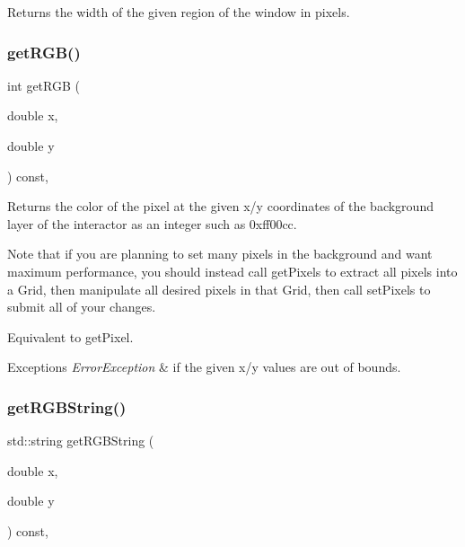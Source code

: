 Returns the width of the given region of the window in pixels. 

\mbox{\label{classGDrawingSurface_a9e983467cf0c97cfd62433a8471570dc}} 
\subsubsection{\texorpdfstring{get\+R\+G\+B()}{getRGB()}}
{\footnotesize\ttfamily int get\+R\+GB (\begin{DoxyParamCaption}\item[{double}]{x,  }\item[{double}]{y }\end{DoxyParamCaption}) const\hspace{0.3cm}{\ttfamily [virtual]}, {\ttfamily [inherited]}}



Returns the color of the pixel at the given x/y coordinates of the background layer of the interactor as an integer such as 0xff00cc. 

Note that if you are planning to set many pixels in the background and want maximum performance, you should instead call get\+Pixels to extract all pixels into a Grid, then manipulate all desired pixels in that Grid, then call set\+Pixels to submit all of your changes.

Equivalent to get\+Pixel.


\begin{DoxyExceptions}{Exceptions}
{\em Error\+Exception} & if the given x/y values are out of bounds. \\
\hline
\end{DoxyExceptions}
\mbox{\label{classGDrawingSurface_a456d3582acc3544f37d939f5cb8802fe}} 
\subsubsection{\texorpdfstring{get\+R\+G\+B\+String()}{getRGBString()}}
{\footnotesize\ttfamily std\+::string get\+R\+G\+B\+String (\begin{DoxyParamCaption}\item[{double}]{x,  }\item[{double}]{y }\end{DoxyParamCaption}) const\hspace{0.3cm}{\ttfamily [virtual]}, {\ttfamily [inherited]}}



